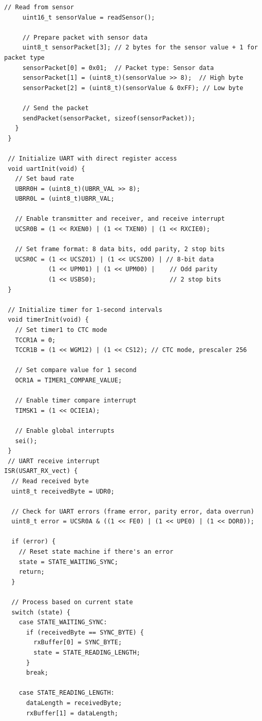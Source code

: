 \documentclass{article}
\begin{document}
\begin{lstlisting}[caption={update ino}, label={lst:example}]
     // Read from sensor
     uint16_t sensorValue = readSensor();
     
     // Prepare packet with sensor data
     uint8_t sensorPacket[3]; // 2 bytes for the sensor value + 1 for packet type
     sensorPacket[0] = 0x01;  // Packet type: Sensor data
     sensorPacket[1] = (uint8_t)(sensorValue >> 8);  // High byte
     sensorPacket[2] = (uint8_t)(sensorValue & 0xFF); // Low byte
     
     // Send the packet
     sendPacket(sensorPacket, sizeof(sensorPacket));
   }
 }
 
 // Initialize UART with direct register access
 void uartInit(void) {
   // Set baud rate
   UBRR0H = (uint8_t)(UBRR_VAL >> 8);
   UBRR0L = (uint8_t)UBRR_VAL;
   
   // Enable transmitter and receiver, and receive interrupt
   UCSR0B = (1 << RXEN0) | (1 << TXEN0) | (1 << RXCIE0);
   
   // Set frame format: 8 data bits, odd parity, 2 stop bits
   UCSR0C = (1 << UCSZ01) | (1 << UCSZ00) | // 8-bit data
            (1 << UPM01) | (1 << UPM00) |    // Odd parity
            (1 << USBS0);                    // 2 stop bits
 }
 
 // Initialize timer for 1-second intervals
 void timerInit(void) {
   // Set timer1 to CTC mode
   TCCR1A = 0;
   TCCR1B = (1 << WGM12) | (1 << CS12); // CTC mode, prescaler 256
   
   // Set compare value for 1 second
   OCR1A = TIMER1_COMPARE_VALUE;
   
   // Enable timer compare interrupt
   TIMSK1 = (1 << OCIE1A);
   
   // Enable global interrupts
   sei();
 }
 // UART receive interrupt
ISR(USART_RX_vect) {
  // Read received byte
  uint8_t receivedByte = UDR0;
  
  // Check for UART errors (frame error, parity error, data overrun)
  uint8_t error = UCSR0A & ((1 << FE0) | (1 << UPE0) | (1 << DOR0));
  
  if (error) {
    // Reset state machine if there's an error
    state = STATE_WAITING_SYNC;
    return;
  }
  
  // Process based on current state
  switch (state) {
    case STATE_WAITING_SYNC:
      if (receivedByte == SYNC_BYTE) {
        rxBuffer[0] = SYNC_BYTE;
        state = STATE_READING_LENGTH;
      }
      break;
      
    case STATE_READING_LENGTH:
      dataLength = receivedByte;
      rxBuffer[1] = dataLength;
      

\end{lstlisting}
\end{document}
